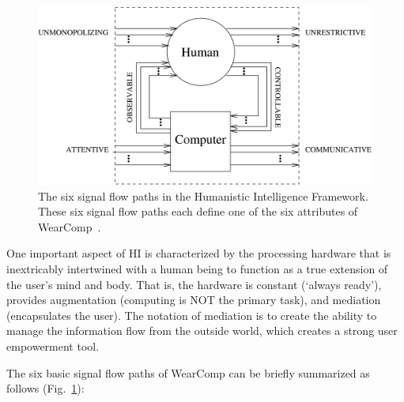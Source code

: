\begin{figure}[htb]
\center
 \includegraphics[width=6.0in]{ch1/figures/Humanistic_intelligence_wearcompdef_multichannel6only.png}
 \caption{The six signal flow paths in the Humanistic Intelligence Framework. These six signal flow paths 
each define one of the six attributes of WearComp~\cite{mann2001wearable}.}
 \label{fig:hiflow}
\end{figure}

One important aspect of HI is characterized by the processing hardware that is inextricably intertwined 
with a human being to function as a true extension of the user's mind and body. That is, the hardware 
is constant (`always ready'), provides augmentation (computing is NOT the primary task), and 
mediation (encapsulates the user). The notation of mediation is to create the ability to manage the 
information flow from the outside world, which creates a strong user empowerment tool.

The six basic signal flow paths of WearComp can be briefly summarized as follows 
(Fig.~\ref{fig:hiflow}): 

